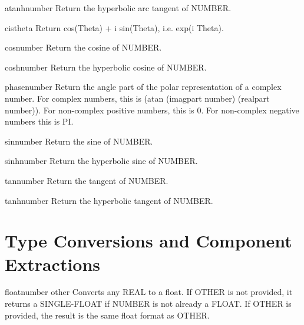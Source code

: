 \begin{function}{atanh}{number}{}{}
  Return the hyperbolic arc tangent of NUMBER.
\end{function}

\begin{function}{cis}{theta}{}{}
  Return cos(Theta) + i sin(Theta), i.e. exp(i Theta).
\end{function}

\begin{function}{cos}{number}{}{}
  Return the cosine of NUMBER.
\end{function}

\begin{function}{cosh}{number}{}{}
  Return the hyperbolic cosine of NUMBER.
\end{function}

\begin{function}{phase}{number}{}{}
  Return the angle part of the polar representation of a complex number.
  For complex numbers, this is (atan (imagpart number) (realpart number)).
  For non-complex positive numbers, this is 0. For non-complex negative
  numbers this is PI.
\end{function}

\begin{function}{sin}{number}{}{}
  Return the sine of NUMBER.
\end{function}

\begin{function}{sinh}{number}{}{}
  Return the hyperbolic sine of NUMBER.
\end{function}

\begin{function}{tan}{number}{}{}
  Return the tangent of NUMBER.
\end{function}

\begin{function}{tanh}{number}{}{}
  Return the hyperbolic tangent of NUMBER.
\end{function}

\section{Type Conversions and Component Extractions}
\label{sec:type-conv-comp}

\begin{function}{float}{number \op other}{}{}
  Converts any REAL to a float. If OTHER is not provided, it returns a
  SINGLE-FLOAT if NUMBER is not already a FLOAT. If OTHER is provided, the
  result is the same float format as OTHER.
\end{function}

